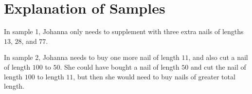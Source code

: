\section*{Explanation of Samples}
In sample 1, Johanna only needs to supplement with three extra nails of lengths $13$, $28$, and $77$.

In sample 2, Johanna needs to buy one more nail of length $11$, and also cut a nail of length $100$ to $50$.
She could have bought a nail of length $50$ and cut the nail of length $100$ to length $11$,
but then she would need to buy nails of greater total length.
